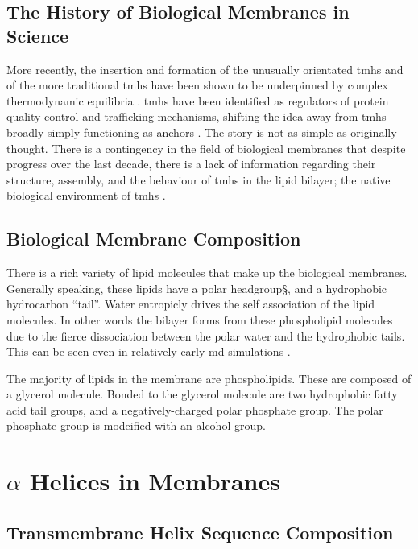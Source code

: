 \subsection{The History of Biological Membranes in Science}

More recently, the insertion and formation of the unusually orientated \gls{tmh}s and of the more traditional \gls{tmh}s have been shown to be underpinned by complex thermodynamic equilibria \cite{Cymer2014}. \gls{tmh}s have been identified as regulators of protein quality control and trafficking mechanisms, shifting the idea away from \gls{tmh}s broadly simply functioning as anchors \cite{Hessa2011}. The story is not as simple as originally thought. There is a contingency in the field of biological membranes that despite progress over the last decade, there is a lack of information regarding their structure, assembly, and the behaviour of \gls{tmh}s in the lipid bilayer; the native biological environment of \gls{tmh}s \cite{Ladokhin2015, Cymer2014}.

\subsection{Biological Membrane Composition}


There is a rich variety of lipid molecules that make up the biological membranes. Generally speaking, these lipids have a polar headgroup§, and a hydrophobic hydrocarbon ``tail''. Water entropicly drives the self association of the lipid molecules. In other words the bilayer forms from these phospholipid molecules due to the fierce dissociation between the polar water and the hydrophobic tails. This can be seen even in relatively early \gls{md} simulations \cite{Goetz1998}.

The majority of lipids in the membrane are phospholipids. These are composed of a glycerol molecule. Bonded to the glycerol molecule are two hydrophobic fatty acid tail groups, and a negatively-charged polar phosphate group. The polar phosphate group is modeified with an alcohol group.


\section{$\alpha$ Helices in Membranes }
\subsection{Transmembrane Helix Sequence Composition}

